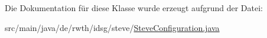 Die Dokumentation für diese Klasse wurde erzeugt aufgrund der Datei\-:\begin{DoxyCompactItemize}
\item 
src/main/java/de/rwth/idsg/steve/\hyperlink{_steve_configuration_8java}{Steve\-Configuration.\-java}\end{DoxyCompactItemize}
